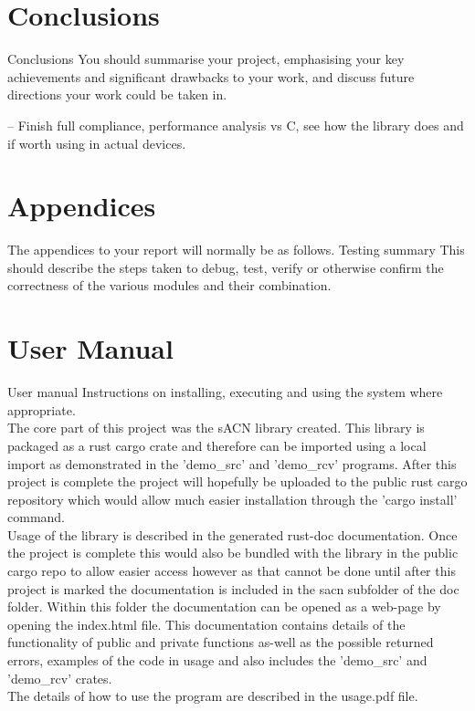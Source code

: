 \documentclass[11pt,a4paper]{report}
\begin{document}
\section{Conclusions}
Conclusions
You should summarise your project, emphasising your
key achievements and significant drawbacks to your
work, and discuss future directions your work could be
taken in.

-- Finish full compliance, performance analysis vs C, see how the library does and if worth using in actual devices. 

\section{Appendices}
The appendices to your report will normally be as follows.
Testing
summary
This should describe the steps taken to debug, test,
verify or otherwise confirm the correctness of the
various modules and their combination.

\section{User Manual}
User manual Instructions on installing, executing and using the
system where appropriate.\\

The core part of this project was the sACN library created. This library is packaged as a rust cargo crate and therefore can be imported using a local import as demonstrated in the 'demo\_src' and 'demo\_rcv' programs. After this project is complete the project will hopefully be uploaded to the public rust cargo repository which would allow much easier installation through the 'cargo install' command.\\

Usage of the library is described in the generated rust-doc documentation. Once the project is complete this would also be bundled with the library in the public cargo repo to allow easier access however as that cannot be done until after this project is marked the documentation is included in the sacn subfolder of the doc folder. Within this folder the documentation can be opened as a web-page by opening the index.html file. This documentation contains details of the functionality of public and private functions as-well as the possible returned errors, examples of the code in usage and also includes the 'demo\_src' and 'demo\_rcv' crates.\\

The details of how to use the program are described in the usage.pdf file.
\end{document}
